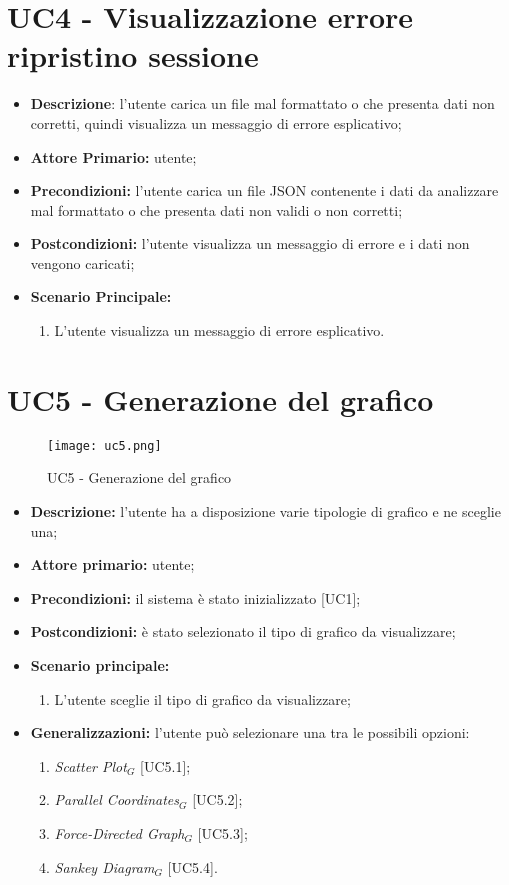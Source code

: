 \section{UC4 - Visualizzazione errore ripristino sessione}
\begin{itemize}
  \item \textbf{Descrizione}: l'utente carica un file mal formattato o che presenta dati non corretti, quindi visualizza un messaggio di errore esplicativo;
  \item \textbf{Attore Primario:} utente;
  \item \textbf{Precondizioni:} l’utente carica un file JSON contenente i dati da analizzare mal formattato o che presenta dati non validi o non corretti;
  \item \textbf{Postcondizioni:} l'utente visualizza un messaggio di errore e i dati non vengono caricati;
  \item \textbf{Scenario Principale:}
  \begin{enumerate}
    \item L'utente visualizza un messaggio di errore esplicativo.
  \end{enumerate}
\end{itemize}

\section{UC5 - Generazione del grafico}
\begin{figure}[H]
 \texttt{[image: uc5.png]}
 \caption{UC5 - Generazione del grafico}
\end{figure}

 \begin{itemize}
     \item \textbf{Descrizione:} l'utente ha a disposizione varie tipologie di grafico e ne sceglie una;
     \item \textbf{Attore primario:} utente;
     \item \textbf{Precondizioni:} il sistema è stato inizializzato [UC1];
     \item \textbf{Postcondizioni:} è stato selezionato il tipo di grafico da visualizzare;
     \item \textbf{Scenario principale:}
     \begin{enumerate}
       \item L'utente sceglie il tipo di grafico da visualizzare;
     \end{enumerate}
     \item \textbf{Generalizzazioni:} l'utente può selezionare una tra le possibili opzioni:
     \begin{enumerate}
         \item \textit{Scatter Plot}$_G$ [UC5.1];
         \item \textit{Parallel Coordinates}$_G$ [UC5.2];
         \item \textit{Force-Directed Graph}$_G$ [UC5.3];
         \item \textit{Sankey Diagram}$_G$ [UC5.4].
     \end{enumerate}
 \end{itemize}

